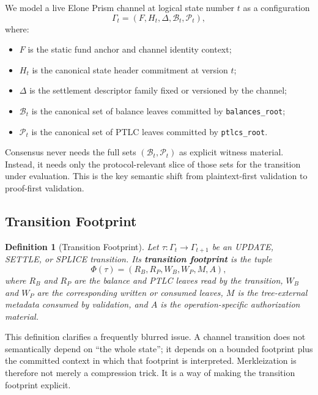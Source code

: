 \documentclass[11pt,a4paper]{article}
\newtheorem{definition}[theorem]{Definition}
\newcommand{\code}[1]{\texttt{#1}}
\begin{document}
We model a live Elone Prism channel at logical state number $t$ as a configuration
\[
\Gamma_t = (F, H_t, \Delta, \mathcal{B}_t, \mathcal{P}_t),
\]
where:
\begin{itemize}
    \item $F$ is the static fund anchor and channel identity context;
    \item $H_t$ is the canonical state header commitment at version $t$;
    \item $\Delta$ is the settlement descriptor family fixed or versioned by the channel;
    \item $\mathcal{B}_t$ is the canonical set of balance leaves committed by \code{balances\_root};
    \item $\mathcal{P}_t$ is the canonical set of PTLC leaves committed by \code{ptlcs\_root}.
\end{itemize}

Consensus never needs the full sets $(\mathcal{B}_t, \mathcal{P}_t)$ as explicit witness material. Instead, it needs only the protocol-relevant slice of those sets for the transition under evaluation. This is the key semantic shift from plaintext-first validation to proof-first validation.

\subsection{Transition Footprint}

\begin{definition}[Transition Footprint]
Let $\tau: \Gamma_t \rightarrow \Gamma_{t+1}$ be an UPDATE, SETTLE, or SPLICE transition. Its \textbf{transition footprint} is the tuple
\[
\Phi(\tau) = (R_B, R_P, W_B, W_P, M, A),
\]
where $R_B$ and $R_P$ are the balance and PTLC leaves read by the transition, $W_B$ and $W_P$ are the corresponding written or consumed leaves, $M$ is the tree-external metadata consumed by validation, and $A$ is the operation-specific authorization material.
\end{definition}

This definition clarifies a frequently blurred issue. A channel transition does not semantically depend on ``the whole state''; it depends on a bounded footprint plus the committed context in which that footprint is interpreted. Merkleization is therefore not merely a compression trick. It is a way of making the transition footprint explicit.
\end{document}
